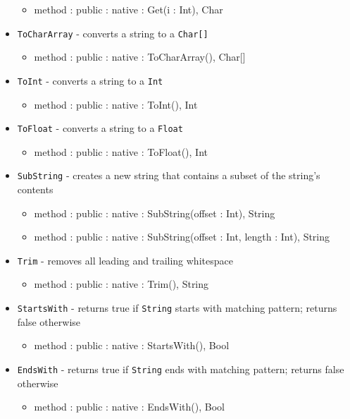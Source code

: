 \documentclass[12pt]{article}
\begin{document}
\begin{itemize}
    	\begin{itemize}
	\item method : public : native : Get(i : Int), Char
	\end{itemize}
    \item \texttt{ToCharArray} - converts a string to a \texttt{Char[]}
    	\begin{itemize}
	\item method : public : native : ToCharArray(), Char[]
	\end{itemize}
    \item \texttt{ToInt} - converts a string to a \texttt{Int}
    	\begin{itemize}
	\item method : public : native : ToInt(), Int
	\end{itemize}
    \item \texttt{ToFloat} - converts a string to a \texttt{Float}
    	\begin{itemize}
	\item method : public : native : ToFloat(), Int
	\end{itemize}
    \item \texttt{SubString} - creates a new string that contains a subset of the string's contents
    	\begin{itemize}
	\item method : public : native : SubString(offset : Int), String
	\item method : public : native : SubString(offset : Int, length : Int), String
	\end{itemize}
    \item \texttt{Trim} - removes all leading and trailing whitespace
    	\begin{itemize}
	\item method : public : native : Trim(), String
	\end{itemize}
    \item \texttt{StartsWith} - returns true if \texttt{String} starts with matching pattern; returns false otherwise
    	\begin{itemize}
	\item method : public : native : StartsWith(), Bool
	\end{itemize}
    \item \texttt{EndsWith} - returns true if \texttt{String} ends with matching pattern; returns false otherwise
    	\begin{itemize}
	\item method : public : native : EndsWith(), Bool

\end{itemize}
\end{itemize}
\end{document}
